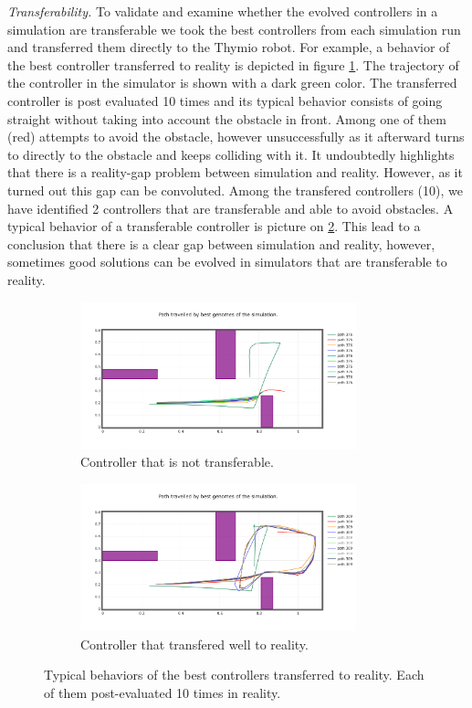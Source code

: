 \emph{Transferability.} To validate and examine whether the evolved controllers in a simulation are transferable we took the best controllers from each simulation run and transferred them directly to the Thymio robot. For example, a behavior of the best controller transferred to reality is depicted in figure \ref{fig:sim_bad_transfer}. The trajectory of the controller in the simulator is shown with a dark green color. The transferred controller is post evaluated 10 times and its typical behavior consists of going straight without taking into account the obstacle in front. Among one of them (red) attempts to avoid the obstacle, however unsuccessfully as it afterward turns to directly to the obstacle and keeps colliding with it. It undoubtedly highlights that there is a reality-gap problem between simulation and reality. However, as it turned out this gap can be convoluted. Among the transfered controllers (10), we have identified 2 controllers that are transferable and able to avoid obstacles. A typical behavior of a transferable controller is picture on \ref{fig:sim_good_transfer}. This lead to a conclusion that there is a clear gap between simulation and reality, however, sometimes good solutions can be evolved in simulators that are transferable to reality.

\begin{figure}[H]
    \centering
    \begin{subfigure}[b]{0.8\textwidth}
    	\centering
        \includegraphics[width=8cm]{include/images/sim_bad_transfer.PNG}
        \caption{Controller that is not transferable.}
        \label{fig:sim_bad_transfer}
    \end{subfigure}
    \begin{subfigure}[b]{0.8\textwidth}
    	\centering
        \includegraphics[width=8cm]{include/images/sim_good_transfer.PNG}
        \caption{Controller that transfered well to reality.}
        \label{fig:sim_good_transfer}
    \end{subfigure}
    \caption{Typical behaviors of the best controllers transferred to reality. Each of them post-evaluated 10 times in reality.}
	\label{fig:transferred_controllers}
\end{figure}

